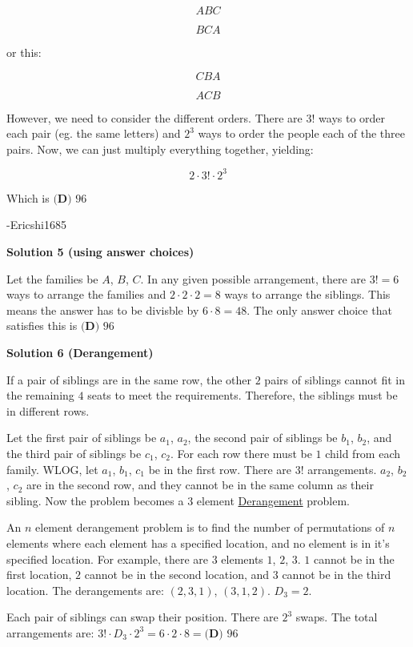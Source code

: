 \begin{enumerate}
 
 \[A B C\]

 \[B C A\]

 or this:

 
 \[C B A\]

 \[A C B\]

 However, we need to consider the different orders. There are $3!$ ways to order each pair (eg. the same letters) and $2^3$ ways to order the people each of the three pairs. Now, we can just multiply everything together, yielding:

 
 \[2\cdot3!\cdot2^3\]

 Which is $\boxed{\textbf{(D) } 96}$

 -Ericshi1685

 



\textbf{Solution 5 (using answer choices)}

Let the families be $A$, $B$, $C$. In any given possible arrangement, there are $3! = 6$ ways to arrange the families and $2 \cdot 2 \cdot 2 = 8$ ways to arrange the siblings. This means the answer has to be divisble by $6 \cdot 8 = 48$. The only answer choice that satisfies this is $\boxed{\textbf{(D) } 96}$




\textbf{Solution 6 (Derangement)}

If a pair of siblings are in the same row, the other $2$ pairs of siblings cannot fit in the remaining $4$ seats to meet the requirements. Therefore, the siblings must be in different rows.

 Let the first pair of siblings be $a_1$, $a_2$, the second pair of siblings be $b_1$, $b_2$, and the third pair of siblings be $c_1$, $c_2$. For each row there must be $1$ child from each family. WLOG, let $a_1$, $b_1$, $c_1$ be in the first row. There are $3!$ arrangements. $a_2$, $b_2$, $c_2$ are in the second row, and they cannot be in the same column as their sibling. Now the problem becomes a $3$ element \href{https://en.wikipedia.org/wiki/Derangement}{Derangement} problem.

 An $n$ element derangement problem is to find the number of permutations of $n$ elements where each element has a specified location, and no element is in it's specified location. For example, there are $3$ elements $1$, $2$, $3$. $1$ cannot be in the first location, $2$ cannot be in the second location, and $3$ cannot be in the third location. The derangements are: $(2,3,1)$, $(3,1,2)$. $D_3=2$.

 Each pair of siblings can swap their position. There are $2^3$ swaps. The total arrangements are: $3! \cdot D_3 \cdot 2^3=6 \cdot 2 \cdot 8 =\boxed{\textbf{(D) } 96}$


\end{enumerate}
